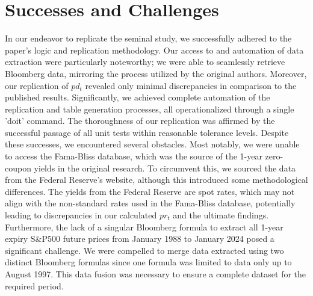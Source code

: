 \documentclass{article}
\begin{document}
\section{Successes and Challenges}
In our endeavor to replicate the seminal study, we successfully 
adhered to the paper's logic and replication methodology. Our 
access to and automation of data extraction were particularly 
noteworthy; we were able to seamlessly retrieve Bloomberg data, 
mirroring the process utilized by the original authors. Moreover, 
our replication of \( pd_t \) revealed only minimal discrepancies 
in comparison to the published results. Significantly, we achieved 
complete automation of the replication and table generation 
processes, all operationalized through a single 'doit' command. 
The thoroughness of our replication was affirmed by the successful 
passage of all unit tests within reasonable tolerance levels.
\newline
\newline
Despite these successes, we encountered several obstacles. Most 
notably, we were unable to access the Fama-Bliss database, which 
was the source of the 1-year zero-coupon yields in the original 
research. To circumvent this, we sourced the data from the Federal 
Reserve's website, although this introduced some methodological 
differences. The yields from the Federal Reserve are spot rates, 
which may not align with the non-standard rates used in the 
Fama-Bliss database, potentially leading to discrepancies in 
our calculated \( pr_t \) and the ultimate findings. Furthermore, 
the lack of a singular Bloomberg formula to extract all 1-year 
expiry S\&P500 future prices from January 1988 to January 2024 
posed a significant challenge. We were compelled to merge data 
extracted using two distinct Bloomberg formulas since one formula 
was limited to data only up to August 1997. This data fusion was 
necessary to ensure a complete dataset for the required period.
\end{document}
